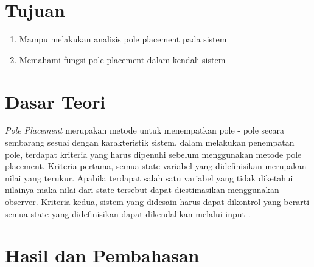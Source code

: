 \documentclass[../main.tex]{subfiles}
\begin{document}
    \section{Tujuan}
        \begin{enumerate}
            \item Mampu melakukan analisis pole placement pada sistem
            \item Memahami fungsi pole placement dalam kendali sistem
        \end{enumerate}
    \section{Dasar Teori}
        \textit{Pole Placement} merupakan metode untuk menempatkan pole - pole secara sembarang sesuai dengan karakteristik sistem. dalam melakukan penempatan pole, terdapat kriteria yang harus dipenuhi sebelum menggunakan metode pole placement. Kriteria pertama, semua state variabel yang didefinisikan merupakan nilai yang terukur. Apabila terdapat salah satu variabel yang tidak diketahui nilainya maka nilai dari state tersebut dapat diestimasikan menggunakan observer. Kriteria kedua, sistem yang didesain harus dapat dikontrol yang berarti semua state yang didefinisikan dapat dikendalikan melalui input \cite{Fahmizal}.
    \section{Hasil dan Pembahasan}
\end{document}
